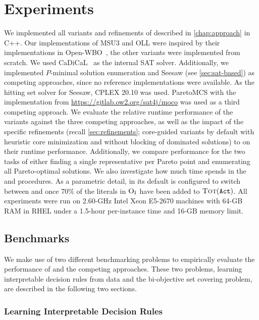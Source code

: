 \chapter{Experiments\label{chap:experiments}}

We implemented  all variants and refinements of \algname{} described in \cref{chap:approach} in C++.
Our implementations of MSU3 and OLL were inspired by their implementations in Open-WBO~\autocite{DBLP:conf/sat/MartinsML14}, the other variants were implemented from scratch.
We used CaDiCaL~\autocite{BiereFazekasFleuryHeisinger-SAT-Competition-2020-solvers} as the internal SAT solver.
Additionally, we implemented $P$-minimal solution enumeration and Seesaw (see \cref{sec:sat-based}) as competing approaches, since no reference implementations were available.
As the hitting set solver for Seesaw, CPLEX 20.10 was used.
ParetoMCS with the implementation from \url{https://gitlab.ow2.org/sat4j/moco} was used as a third competing approach.
We evaluate the relative runtime performance of the \algname{} variants against the three competing approaches, as well as the impact of the specific refinements (recall \cref{sec:refinements}; core-guided variants by default with heuristic core minimization and without blocking of dominated solutions) to \algname{} on their runtime performance.
Additionally, we compare performance for the two tasks of either finding a single representative per Pareto point and enumerating all Pareto-optimal solutions.
We also investigate how much time \algname{} spends in the \Min{} and \Simpr{} procedures.
As a parametric detail, in its default \msh{} is configured to switch between \msu{} and \satunsat{} once 70\% of the literals in $\textsc{O}_{\text{I}}$ have been added to $\textsc{Tot}(\texttt{Act})$.
All experiments were run on 2.60-GHz Intel Xeon E5-2670 machines with 64-GB RAM in RHEL under a 1.5-hour per-instance time and 16-GB memory limit.

\section{Benchmarks\label{sec:benchmarks}}

We make use of two different benchmarking problems to empirically evaluate the performance of \algname{} and the competing approaches.
These two problems, learning interpretable decision rules from data and the bi-objective set covering problem, are described in the following two sections.

\subsection{Learning Interpretable Decision Rules\label{sec:lidr}}

